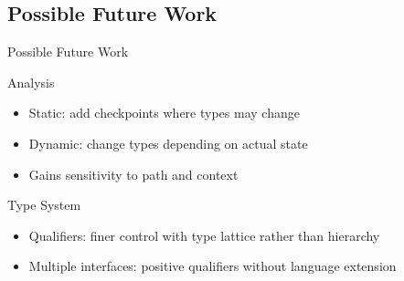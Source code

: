 \documentclass{beamer}
\begin{document}
\subsection{Possible Future Work}
\begin{frame}{Possible Future Work}
  \begin{block}{Analysis}
    \begin{itemize}
    \item Static: add checkpoints where types may change
    \item Dynamic: change types depending on actual state
    \item Gains sensitivity to path and context
    \end{itemize}
  \end{block}
\pause
  \begin{block}{Type System}
    \begin{itemize}
    \item Qualifiers: finer control with type lattice rather than hierarchy
    \item Multiple interfaces: positive qualifiers without language extension
    \end{itemize}
  \end{block}
\end{frame}
\end{document}

